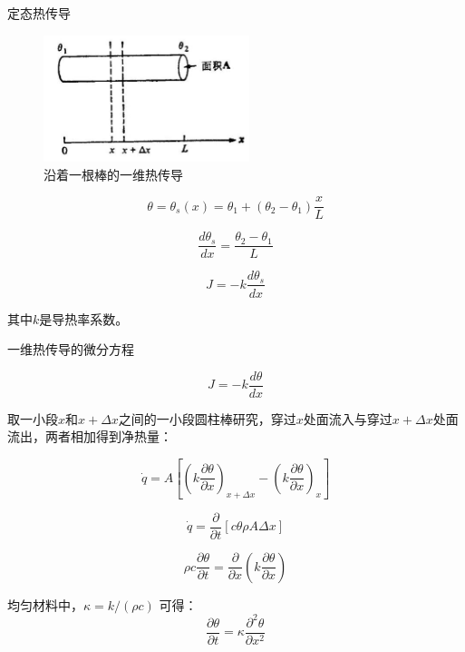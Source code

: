 \documentclass[10pt]{beamer}
\begin{document}
\begin{frame}[allowframebreaks]{定态热传导}

\begin{figure}[htp]
  \centering
  \includegraphics[width=6cm]{1.1.jpeg}
  \caption{沿着一根棒的一维热传导}
  \label{fig:1.1}
\end{figure}


\begin{equation}
\theta=\theta_{s}(x)=\theta_{1}+\left(\theta_{2}-\theta_{1}\right) \frac{x}{L}
\end{equation} 

\begin{equation}
\frac{d \theta_{s}}{d x}=\frac{\theta_{2}-\theta_{1}}{L}
\end{equation}

\begin{equation}
J=-k \frac{d \theta_{s}}{d x}
\end{equation}

其中$k$是导热率系数。

\end{frame}

\begin{frame}[allowframebreaks]{一维热传导的微分方程}


\begin{equation}
J=-k \frac{d \theta}{d x}
\end{equation}

取一小段$x$和$x+\Delta x$之间的一小段圆柱棒研究，穿过$x$处面流入与穿过$x+\Delta x$处面流出，两者相加得到净热量：


\begin{equation}
\dot{q}=A\left [ \left ( k\frac{\partial \theta }{\partial x}\right )_{x+\Delta x}-\left ( k\frac{\partial \theta }{\partial x}\right )_{x}\right ]
\end{equation}

\begin{equation}
\dot{q}=\frac{\partial }{\partial t}\left [ c\theta \rho A\Delta x\right ]
\end{equation}


\begin{equation}
\rho c \frac{\partial \theta}{\partial t}=\frac{\partial}{\partial x}\left(k \frac{\partial \theta}{\partial x}\right)
\end{equation}

均匀材料中，$\kappa =k/\left ( \rho c\right )$
可得：
\begin{equation}
\frac{\partial \theta}{\partial t}=\kappa \frac{\partial^{2} \theta}{\partial x^{2}}
\end{equation}


\end{frame}
\end{document}
